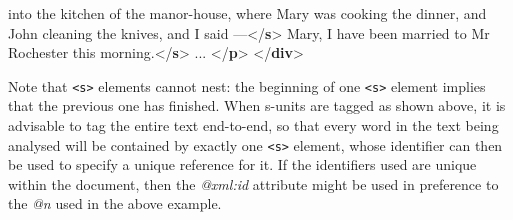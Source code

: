 \documentclass[11pt,twoside]{article}\makeatletter
\begin{document}
\begin{shaded}
\hspace*{6pt}\hspace*{6pt}\hspace*{6pt}\hspace*{6pt} into the kitchen of the manor-house, where Mary was cooking\mbox{}\newline 
\hspace*{6pt}\hspace*{6pt}\hspace*{6pt}\hspace*{6pt} the dinner, and John cleaning the knives,\mbox{}\newline 
\hspace*{6pt}\hspace*{6pt}\hspace*{6pt}\hspace*{6pt} and I said —{</\textbf{s}>}\mbox{}\newline 
{}\mbox{}\newline 
{}\mbox{}\newline 
\hspace*{6pt}\mbox{}\newline 
\hspace*{6pt}\hspace*{6pt}Mary, I have been married to Mr Rochester\mbox{}\newline 
\hspace*{6pt}\hspace*{6pt}\hspace*{6pt}\hspace*{6pt}\hspace*{6pt}\hspace*{6pt} this morning.{</\textbf{s}>}\mbox{}\newline 
\hspace*{6pt} ... {</\textbf{p}>}\mbox{}\newline 
{</\textbf{div}>}\end{shaded}\egroup\par \noindent  Note that \texttt{<s>} elements cannot nest: the beginning of one \texttt{<s>} element implies that the previous one has finished. When s-units are tagged as shown above, it is advisable to tag the entire text end-to-end, so that every word in the text being analysed will be contained by exactly one \texttt{<s>} element, whose identifier can then be used to specify a unique reference for it. If the identifiers used are unique within the document, then the \textit{@xml:id} attribute might be used in preference to the \textit{@n} used in the above example.
\end{document}
